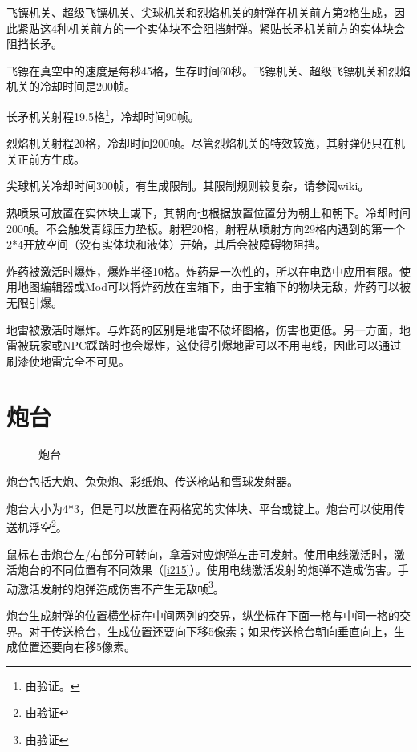 飞镖机关、超级飞镖机关、尖球机关和烈焰机关的射弹在机关前方第2格生成，因此紧贴这4种机关前方的一个实体块不会阻挡射弹。紧贴长矛机关前方的实体块会阻挡长矛。

飞镖在真空中的速度是每秒45格，生存时间60秒。飞镖机关、超级飞镖机关和烈焰机关的冷却时间是200帧。

长矛机关射程19.5格\footnote{由验证。}，冷却时间90帧。

烈焰机关射程20格，冷却时间200帧。尽管烈焰机关的特效较宽，其射弹仍只在机关正前方生成。

尖球机关冷却时间300帧，有生成限制。其限制规则较复杂，请参阅wiki。

热喷泉可放置在实体块上或下，其朝向也根据放置位置分为朝上和朝下。冷却时间200帧。不会触发青绿压力垫板。射程20格，射程从喷射方向29格内遇到的第一个2*4开放空间（没有实体块和液体）开始，其后会被障碍物阻挡。

炸药被激活时爆炸，爆炸半径10格。炸药是一次性的，所以在电路中应用有限。使用地图编辑器或Mod可以将炸药放在宝箱下，由于宝箱下的物块无敌，炸药可以被无限引爆。

地雷被激活时爆炸。与炸药的区别是地雷不破坏图格，伤害也更低。另一方面，地雷被玩家或NPC踩踏时也会爆炸，这使得引爆地雷可以不用电线，因此可以通过刷漆使地雷完全不可见。

\section{炮台}\label{sec:cannon}
\begin{figure}[!ht]
  \centering
  \qquad
  \qquad
  \qquad
  \qquad
  \caption{炮台}
\end{figure}
炮台包括大炮、兔兔炮、彩纸炮、传送枪站和雪球发射器。

炮台大小为4*3，但是可以放置在两格宽的实体块、平台或锭上。炮台可以使用传送机浮空\footnote{由验证}。

鼠标右击炮台左/右部分可转向，拿着对应炮弹左击可发射。使用电线激活时，激活炮台的不同位置有不同效果（\autoref{i215}）。使用电线激活发射的炮弹不造成伤害。手动激活发射的炮弹造成伤害不产生无敌帧\footnote{由验证}。

炮台生成射弹的位置横坐标在中间两列的交界，纵坐标在下面一格与中间一格的交界。对于传送枪台，生成位置还要向下移5像素；如果传送枪台朝向垂直向上，生成位置还要向右移5像素。

